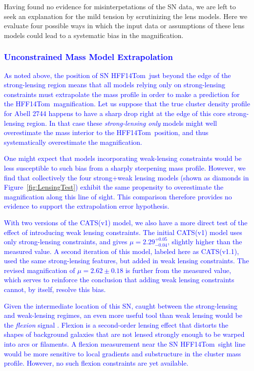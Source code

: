 \documentclass[iop]{emulateapj}
\newcommand{\change}[1]{{ \textcolor{blue}{#1}}}
\newcommand{\change}[1]{#1}
\def\tomas{HFF14Tom}
\begin{document}
Having found no evidence for misinterpetations of the SN
data, we are left to seek an explanation for the mild tension by
scrutinizing the lens models.  Here we evaluate four
possible ways in which the input data or assumptions of these
lens models could lead to a systematic bias in the magnification.

\change{\subsubsection{Unconstrained Mass Model Extrapolation}}

\change{As noted above, the position 
of SN \tomas\ just beyond the edge of the strong-lensing region means
that all models relying only on strong-lensing constraints must
extrapolate the mass profile in order to make a prediction for
the \tomas\ magnification.  Let us suppose that the true cluster
density profile for Abell 2744 happens to have a sharp drop right at
the edge of this core strong-lensing region. In that case these {\it
strong-lensing only} models might well overestimate the mass interior
to the \tomas\ position, and thus systematically overestimate the
magnification.}

\change{ One might expect that models incorporating weak-lensing
constraints would be less susceptible to such bias from a sharply
steepening mass profile.  However, we find that collectively the four
strong+weak lensing models (shown as diamonds in
Figure~\ref{fig:LensingTest}) exhibit the same propensity to
overestimate the magnification along this line of sight.  This
comparison therefore provides no evidence to support the extrapolation
error hypothesis. }

\change{With two versions of the CATS(v1) model, we also have a 
more direct test of the effect of introducing weak lensing
constraints.  The initial CATS(v1) model uses only strong-lensing
constraints, and gives $\mu=2.29^{+0.05}_{-0.04}$, slightly higher
than the measured value.  A second iteration of this model, labeled
here as CATS(v1.1), used the same strong-lensing features, but added
in weak lensing constraints.  The revised magnification of
$\mu=2.62\pm0.18$ is further from the measured value, which serves to
reinforce the conclusion that adding weak lensing constraints cannot,
by itself, resolve this bias.}

\change{Given the intermediate location of this SN, caught between the
strong-lensing and weak-lensing regimes, an even more useful tool than
weak lensing would be the {\it flexion}
signal \citep{Goldberg:2002,Goldberg:2005,Irwin:2006,Goldberg:2007}.
Flexion is a second-order lensing effect that distorts the shapes of
background galaxies that are not lensed strongly enough to be warped
into arcs or filaments.  A flexion measurement near the SN \tomas\
sight line would be more sensitive to local gradients and substructure
in the cluster mass profile.  However, no such flexion constraints are
yet available.}
\end{document}
